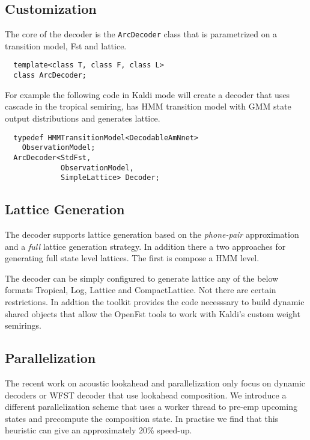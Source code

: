 \documentclass{article}
\begin{document}
\subsection{Customization}
\label{sec:custom}
The core of the decoder is the \texttt{ArcDecoder} class that is parametrized on a transition
model, Fst  and lattice.
\begin{verbatim}
  template<class T, class F, class L>
  class ArcDecoder;
\end{verbatim}

For example the following code in Kaldi mode will create a decoder that uses
cascade in the tropical semiring, has HMM transition model with GMM state 
output distributions and generates lattice.

\begin{verbatim}
  typedef HMMTransitionModel<DecodableAmNnet> 
    ObservationModel;
  ArcDecoder<StdFst,         
             ObservationModel,
             SimpleLattice> Decoder;
\end{verbatim}

\subsection{Lattice Generation}
The decoder supports lattice generation based on the \emph{phone-pair}
approximation and a \emph{full} lattice generation strategy. In addition 
there a two approaches for generating full state level lattices. The first
is compose a HMM level.

The decoder can be simply configured to generate lattice any of the below formats
Tropical, Log, Lattice and CompactLattice. Not there are certain restrictions.
In addtion the toolkit provides the code necesssary to build dynamic shared objects
that allow the OpenFst tools to work with Kaldi's custom weight semirings.

\subsection{Parallelization}
The recent work on acoustic lookahead and parallelization only focus on dynamic decoders
or WFST decoder that use lookahead composition. We introduce a different parallelization
scheme that uses a worker thread to pre-emp upcoming states and precompute the composition
state. In practise we find that this heuristic can give an approximately 20\% speed-up.
\end{document}
